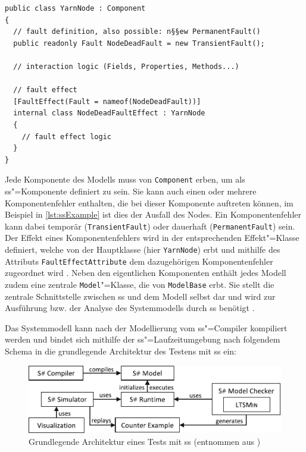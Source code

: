 \begin{lstlisting}[label=lst:ssExample,style=cs,
caption={Grundlegender Aufbau einer \glsentryshort{ss}"=Komponente.}]
public class YarnNode : Component
{
  // fault definition, also possible: n§§ew PermanentFault()
  public readonly Fault NodeDeadFault = new TransientFault();
  
  // interaction logic (Fields, Properties, Methods...)
  
  // fault effect
  [FaultEffect(Fault = nameof(NodeDeadFault))]
  internal class NodeDeadFaultEffect : YarnNode
  {
    // fault effect logic
  }
}
\end{lstlisting}

Jede Komponente des Modells muss von \texttt{Component} erben, um als \gls{ss}"=Komponente definiert zu sein.
Sie kann auch einen oder mehrere Komponentenfehler enthalten, die bei dieser Komponente auftreten können, im Beispiel in \cref{lst:ssExample} ist dies der Ausfall des Nodes.
Ein Komponentenfehler kann dabei temporär (\texttt{TransientFault}) oder dauerhaft (\texttt{PermanentFault}) sein.
Der Effekt eines Komponentenfehlers wird in der entsprechenden Effekt"=Klasse definiert, welche von der Hauptklasse (hier \texttt{YarnNode}) erbt und mithilfe des Attributs \texttt{FaultEffectAttribute} dem dazugehörigen Komponentenfehler zugeordnet wird \cite{Habermaier2016,Habermaier2015}.
Neben den eigentlichen Komponenten enthält jedes Modell zudem eine zentrale \texttt{Model}"=Klasse, die von \texttt{ModelBase} erbt.
Sie stellt die zentrale Schnittstelle zwischen \gls{ss} und dem Modell selbst dar und wird zur Ausführung bzw. der Analyse des Systemmodells durch \gls{ss} benötigt \cite{SSWikiModels}.

Das Systemmodell kann nach der Modellierung vom \gls{ss}"=Compiler kompiliert werden und bindet sich mithilfe der \gls{ss}"=Laufzeitumgebung nach folgendem Schema in die grundlegende Architektur des Testens mit \gls{ss} ein:

\begin{figure}[h]
    \includegraphics{./resources/ssharpArchitecture.pdf}
    \caption[Grundlegende Architektur eines Tests mit ]
    {Grundlegende Architektur eines Tests mit \gls{ss} (entnommen aus \cite{Habermaier2016})}
    \label{fig:ssharpTestApproach}
\end{figure}

